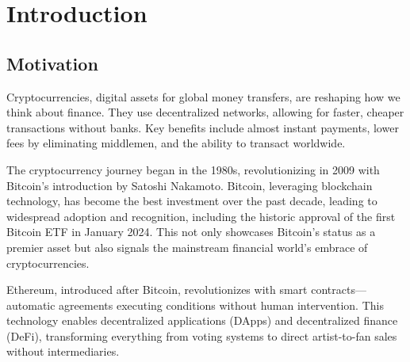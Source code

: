 \chapter{Introduction}


\label{intro}

\section{Motivation}
\label{sec:ch1sec1}

\par Cryptocurrencies, digital assets for global money transfers, are reshaping how we think about finance. They use decentralized networks, allowing for faster, cheaper transactions without banks. Key benefits include almost instant payments, lower fees by eliminating middlemen, and the ability to transact worldwide.

\par The cryptocurrency journey began in the 1980s, revolutionizing in 2009 with Bitcoin's introduction by Satoshi Nakamoto. Bitcoin, leveraging blockchain technology, has become the best investment over the past decade, leading to widespread adoption and recognition, including the historic approval of the first Bitcoin ETF in January 2024. This not only showcases Bitcoin's status as a premier asset but also signals the mainstream financial world's embrace of cryptocurrencies.

\par Ethereum, introduced after Bitcoin, revolutionizes with smart contracts—automatic agreements executing conditions without human intervention. This technology enables decentralized applications (DApps) and decentralized finance (DeFi), transforming everything from voting systems to direct artist-to-fan sales without intermediaries.

